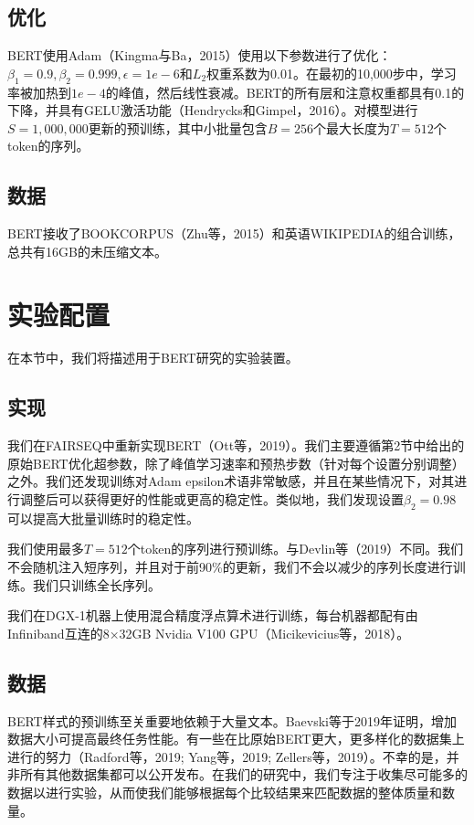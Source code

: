 \documentclass[lang=cn,11pt,a4paper,twocolumn]{elegantpaper}
\begin{document}
\subsection{优化}
BERT使用Adam（Kingma与Ba，2015）使用以下参数进行了优化：$\beta_1= 0.9,\beta_2= 0.999,\epsilon=1e-6$和$L_2$权重系数为0.01。在最初的10,000步中，学习率被加热到$1e-4$的峰值，然后线性衰减。BERT的所有层和注意权重都具有0.1的下降，并具有GELU激活功能（Hendrycks和Gimpel，2016）。对模型进行$S = 1,000,000$更新的预训练，其中小批量包含$B = 256$个最大长度为$T = 512$个token的序列。

\subsection{数据}
BERT接收了BOOKCORPUS（Zhu等，2015）和英语WIKIPEDIA的组合训练，总共有16GB的未压缩文本。

\section{实验配置}
在本节中，我们将描述用于BERT研究的实验装置。
\subsection{实现}
我们在FAIRSEQ中重新实现BERT（Ott等，2019）。我们主要遵循第2节中给出的原始BERT优化超参数，除了峰值学习速率和预热步数（针对每个设置分别调整）之外。我们还发现训练对Adam epsilon术语非常敏感，并且在某些情况下，对其进行调整后可以获得更好的性能或更高的稳定性。类似地，我们发现设置$\beta_2= 0.98$可以提高大批量训练时的稳定性。

我们使用最多$T = 512$个token的序列进行预训练。与Devlin等（2019）不同。我们不会随机注入短序列，并且对于前90\%的更新，我们不会以减少的序列长度进行训练。我们只训练全长序列。

我们在DGX-1机器上使用混合精度浮点算术进行训练，每台机器都配有由Infiniband互连的8×32GB Nvidia V100 GPU（Micikevicius等，2018）。
\subsection{数据}
BERT样式的预训练至关重要地依赖于大量文本。Baevski等于2019年证明，增加数据大小可提高最终任务性能。有一些在比原始BERT更大，更多样化的数据集上进行的努力（Radford等，2019; Yang等，2019; Zellers等，2019）。不幸的是，并非所有其他数据集都可以公开发布。在我们的研究中，我们专注于收集尽可能多的数据以进行实验，从而使我们能够根据每个比较结果来匹配数据的整体质量和数量。
\end{document}
